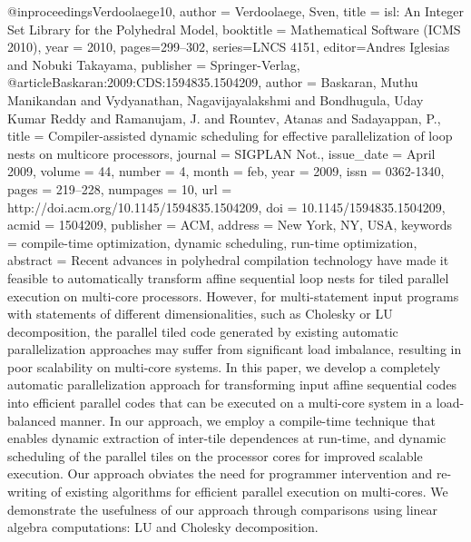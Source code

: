@inproceedings{Verdoolaege10,
   author = {Verdoolaege, Sven},
   title = {isl: {A}n Integer Set Library for the Polyhedral Model},
   booktitle = {Mathematical Software (ICMS 2010)},
   year = {2010},
   pages={299--302},
   series={LNCS 4151},
   editor={Andres Iglesias and Nobuki Takayama},
   publisher = {Springer-Verlag},
}
@article{Baskaran:2009:CDS:1594835.1504209,
 author = {Baskaran, Muthu Manikandan and Vydyanathan, Nagavijayalakshmi and Bondhugula, Uday Kumar Reddy and Ramanujam, J. and Rountev, Atanas and Sadayappan, P.},
 title = {Compiler-assisted dynamic scheduling for effective parallelization of loop nests on multicore processors},
 journal = {SIGPLAN Not.},
 issue_date = {April 2009},
 volume = {44},
 number = {4},
 month = feb,
 year = {2009},
 issn = {0362-1340},
 pages = {219--228},
 numpages = {10},
 url = {http://doi.acm.org/10.1145/1594835.1504209},
 doi = {10.1145/1594835.1504209},
 acmid = {1504209},
 publisher = {ACM},
 address = {New York, NY, USA},
 keywords = {compile-time optimization, dynamic scheduling, run-time optimization},
 abstract = {Recent advances in polyhedral compilation technology have made it feasible to automatically transform affine sequential loop nests for tiled parallel execution on multi-core processors. However, for multi-statement input programs with statements of different dimensionalities, such as Cholesky or LU decomposition, the parallel tiled code generated by existing automatic parallelization approaches may suffer from significant load imbalance, resulting in poor scalability on multi-core systems. In this paper, we develop a completely automatic parallelization approach for transforming input affine sequential codes into efficient parallel codes that can be executed on a multi-core system in a load-balanced manner. In our approach, we employ a compile-time technique that enables dynamic extraction of inter-tile dependences at run-time, and dynamic scheduling of the parallel tiles on the processor cores for improved scalable execution. Our approach obviates the need for programmer intervention and re-writing of existing algorithms for efficient parallel execution on multi-cores. We demonstrate the usefulness of our approach through comparisons using linear algebra computations: LU and Cholesky decomposition.}
}

